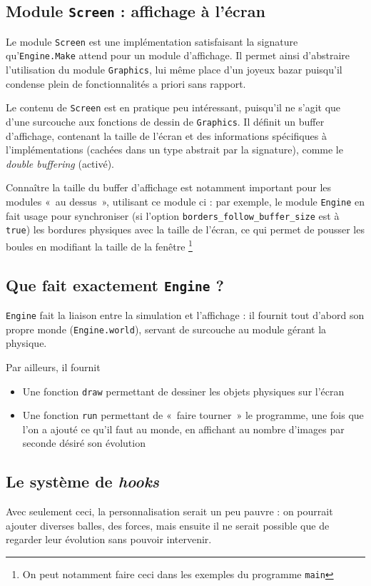 \documentclass[a4paper]{scrartcl}
\begin{document}
\subsection{Module \texttt{Screen} : affichage à l'écran}
Le module \texttt{Screen} est une implémentation satisfaisant la
signature qu'\texttt{Engine.Make} attend pour un module
d'affichage. Il permet ainsi d'abstraire l'utilisation du module
\texttt{Graphics}, lui même place d'un joyeux bazar puisqu'il condense
plein de fonctionnalités a priori sans rapport.

Le contenu de \texttt{Screen} est en pratique peu intéressant,
puisqu'il ne s'agit que d'une surcouche aux fonctions de dessin de
\texttt{Graphics}. Il définit un buffer d'affichage, contenant la
taille de l'écran et des informations spécifiques à l'implémentations
(cachées dans un type abstrait par la signature), comme le
\emph{double buffering} (activé).

Connaître la taille du buffer d'affichage est notamment important pour
les modules «~au dessus~», utilisant ce module ci : par exemple, le
module \texttt{Engine} en fait usage pour synchroniser (si l'option
\texttt{borders\_follow\_buffer\_size} est à \texttt{true}) les bordures
physiques avec la taille de l'écran, ce qui permet de pousser les
boules en modifiant la taille de la fenêtre \footnote{On peut
  notamment faire ceci dans les exemples du programme \texttt{main}}

\subsection{Que fait exactement \texttt{Engine} ?}
\texttt{Engine} fait la liaison entre la simulation et l'affichage :
il fournit tout d'abord son propre monde (\texttt{Engine.world}),
servant de surcouche au module gérant la physique.

Par ailleurs, il fournit 
\begin{itemize}
\item Une fonction \texttt{draw} permettant de dessiner les objets
  physiques sur l'écran
\item Une fonction \texttt{run} permettant de «~faire tourner~» le
  programme, une fois que l'on a ajouté ce qu'il faut au monde, en
  affichant au nombre d'images par seconde désiré son évolution
\end{itemize}

\subsection{Le système de \emph{hooks}}
Avec seulement ceci, la personnalisation serait un peu pauvre : on
pourrait ajouter diverses balles, des forces, mais ensuite il ne
serait possible que de regarder leur évolution sans pouvoir
intervenir.
\end{document}
